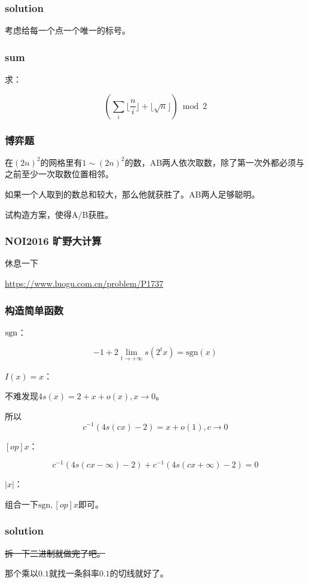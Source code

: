 \documentclass[10pt]{beamer}
\begin{document}
	\begin{frame}
		\frametitle{solution}
	
		考虑给每一个点一个唯一的标号。
	
	\end{frame}
	\begin{frame}
		\frametitle{sum}
	
		求：

		$$
		(\sum_i \lfloor\dfrac ni\rfloor+\lfloor\sqrt n\rfloor)\bmod 2
		$$
	
	\end{frame}
	\begin{frame}
		\frametitle{博弈题}
	
		在$(2n)^2$的网格里有$1\sim (2n)^2$的数，AB两人依次取数，除了第一次外都必须与之前至少一次取数位置相邻。

		如果一个人取到的数总和较大，那么他就获胜了。AB两人足够聪明。

		试构造方案，使得A/B获胜。
	
	\end{frame}
	\begin{frame}
		\frametitle{NOI2016 旷野大计算}
	
		休息一下
		
		\url{https://www.luogu.com.cn/problem/P1737}
	
	\end{frame}
	\begin{frame}
		\frametitle{构造简单函数}

		$\rm sgn$：

		$$
		-1+2\lim_{t\rightarrow +\infty}s(2^tx)=\mathrm{sgn}(x)
		$$

		$I(x)=x$：

		不难发现$4s(x)=2+x+o(x),x\rightarrow 0$。

		所以
		$$
		c^{-1}(4s(cx)-2)=x+o(1),c\rightarrow 0
		$$

		$[op]x$：

		$$
		c^{-1}(4s(cx-\infty)-2)+c^{-1}(4s(cx+\infty)-2)=0
		$$

		$|x|$：

		组合一下$\mathrm{sgn},[op]x$即可。
		
	\end{frame}
	\begin{frame}
		\frametitle{solution}
	
		\sout{拆一下二进制就做完了吧。}

		那个乘以$0.1$就找一条斜率$0.1$的切线就好了。
	
	\end{frame}
\end{document}
